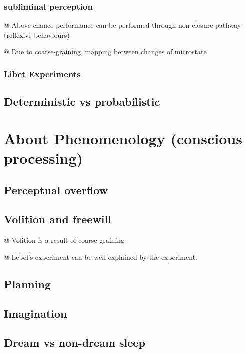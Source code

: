 \documentclass[utf8]{article}
\newenvironment{ants}
			{
			 \begin{easylist}[itemize]		
		 	}
			{
			\end{easylist}
			}
\begin{document}
			\subsubsection{subliminal perception}
				\begin{ants}
					@ Above chance performance can be performed through non-closure pathway (reflexive behaviours) 
					
					@ Due to coarse-graining, mapping between changes of microstate
				\end{ants}
			\subsubsection{Libet Experiments}		
		
			
		\subsection{Deterministic vs probabilistic}
			\cite{dehaene2017consciousness}
			\cite{vul2008temporal, moreno2011bayesian, asplund2014attentional, vul2009attention}
			
			
	\section{About Phenomenology (conscious processing)}
		\subsection{Perceptual overflow}
		\subsection{Volition and freewill}
			\begin{ants}
				@ Volition is a result of coarse-graining
				
				@ Lebel's experiment can be well explained by the experiment.
			\end{ants}
		
		
		
		\subsection{Planning}
		\subsection{Imagination}
		\subsection{Dream vs non-dream sleep}
\end{document}
